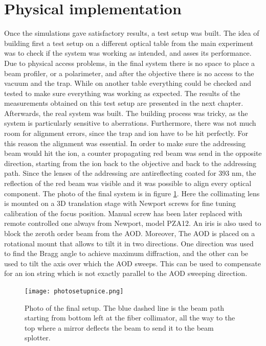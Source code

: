 \section{Physical implementation}
Once the simulations gave satisfactory results, a test setup was built. The idea of building first a test setup on a different optical table from the main experiment was to check if the system was working as intended, and asses its performance. Due to physical access problems, in the final system there is no space to place a beam profiler, or a polarimeter, and after the objective there is no access to the vacuum and the trap. While on another table everything could be checked and tested to make sure everything was working as expected. The results of the measurements obtained on this test setup are presented in the next chapter.\\
Afterwards, the real system was built. The building process was tricky, as the system is particularly sensitive to aberrations. Furthermore, there was not much room for alignment errors, since the trap and ion have to be hit perfectly. For this reason the alignment was essential. In order to make sure the addressing beam would hit the ion, a counter propagating red beam was send in the opposite direction, starting from the ion back to the objective and back to the addressing path. Since the lenses of the addressing are antireflecting coated for 393 nm, the reflection of the red beam was visible and it was possible to align every optical component. The photo of the final system is in figure \ref{photosetup}. Here the collimating lens is mounted on a 3D translation stage with Newport screws for fine tuning calibration of the focus position. Manual screw has been later replaced with remote controlled one always from Newport, model PZA12. An iris is also used to block the zeroth order beam from the AOD. Moreover, The AOD is placed on a rotational mount that allows to tilt it in two directions. One direction was used to find the Bragg angle to achieve maximum diffraction, and the other can be used to tilt the axis over which the AOD sweeps. This can be used to compensate for an ion string which is not exactly parallel to the AOD sweeping direction.

\begin{figure}[H]
\centering
\texttt{[image: photosetupnice.png]}
\caption{Photo of the final setup. The blue dashed line is the beam path starting from bottom left at the fiber collimator, all the way to the top where a mirror deflects the beam to send it to the beam splotter.}
\label{photosetup}
\end{figure}
